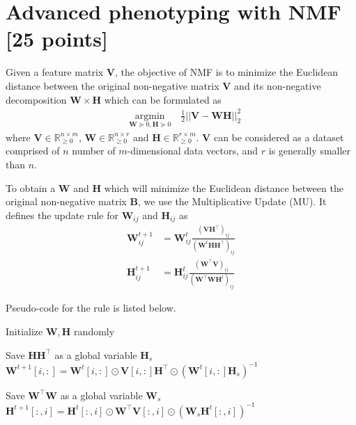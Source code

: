 \documentclass[12pt]{article}
\begin{document}
\section{Advanced phenotyping with NMF [25 points]}
Given a feature matrix $\bm{V}$, the objective of NMF is to minimize the Euclidean distance between the original non-negative matrix $\bm{V}$ and its non-negative decomposition $\bm{W \times H}$ which can be formulated as
\begin{align}
& \underset{\bm{W} \succeq 0, \bm{H} \succeq 0 }{\text{argmin}} \quad \frac{1}{2} ||\bm{V} - \bm{W}\bm{H}||_2^2 \label{eq:nmf_obj}
\end{align}
where $\bm{V} \in \mathbb{R}_{\geq 0}^{n \times m}$, $\bm{W} \in \mathbb{R}_{\geq 0}^{n \times r}$ and $\bm{H} \in \mathbb{R}_{\geq 0}^{r \times m}$. $\bm{V}$ can be considered as a dataset comprised of $n$ number of $m$-dimensional data vectors, and $r$ is generally smaller than $n$. 

To obtain a $\bm{W}$ and $\bm{H}$ which will minimize the Euclidean distance between the original non-negative matrix $\bm{B}$, we use the Multiplicative Update (MU). It defines the update rule for $\bm{W}_{ij}$ and $\bm{H}_{ij}$ as
\begin{align*}
\bm{W}_{ij}^{t+1} & = \bm{W}_{ij}^{t} \frac{(\bm{V} \bm{H}^{\top})_{ij}}{(\bm{W}^{t} \bm{H} \bm{H}^{\top})_{ij}} \\
\bm{H}_{ij}^{t+1} & = \bm{H}_{ij}^{t} \frac{(\bm{W}^{\top} \bm{V})_{ij}}{(\bm{W}^{\top} \bm{W} \bm{H}^t)_{ij}}
\end{align*}

Pseudo-code for the rule is listed below.

\begin{algorithm}
Initialize $\bm{W}, \bm{H}$ randomly\;
{
	Save $\bm{H} \bm{H}^{\top}$ as a global variable $\bm{H}_{s}$\;
	$\bm{W}^{t+1}[i,:] = \bm{W}^{t}[i,:] \odot \bm{V}[i,:] \bm{H}^{\top} \odot (\bm{W}^{t}[i,:] \bm{H}_s)^{-1}$
    
	Save $\bm{W}^{\top} \bm{W}$ as a global variable $\bm{W}_{s}$\;
	$\bm{H}^{t+1}[:,i] = \bm{H}^{t}[:,i] \odot \bm{W}^{\top} \bm{V}[:,i] \odot (\bm{W}_{s} \bm{H}^{t}[:,i])^{-1}$
}
\end{algorithm}
\end{document}
